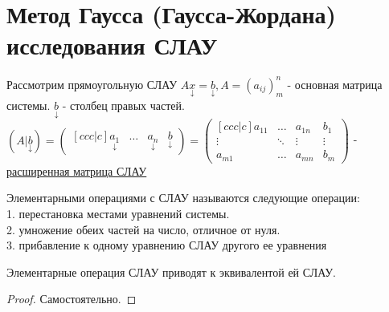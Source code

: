 \documentclass[../main.tex]{subfiles}
\begin{document}
\section{Метод Гаусса (Гаусса-Жордана) исследования СЛАУ}
Рассмотрим  прямоугольную СЛАУ $A \underset{\downarrow}{x}=\underset{\downarrow}{b}, A = (a_{ij})_{m}^{n}$ - основная матрица системы. $\underset{\downarrow}{b}$ - столбец правых частей. $(A|\underset{\downarrow}{b})=\begin{pmatrix}[ccc|c]
    \underset{\downarrow}{a_{1}}& \dots & \underset{\downarrow}{a_{n}}& \underset{\downarrow}{b}
\end{pmatrix}=\begin{pmatrix}[ccc|c]
    a_{11}&\dots & a_{1n} & b_{1}\\ 
    \vdots & \ddots & \vdots & \vdots \\ 
    a_{m1} & \dots & a_{mn} & b_{m}
\end{pmatrix}$ - \underline{расширенная матрица СЛАУ}
\begin{definition}
    Элементарными операциями с СЛАУ называются следующие операции:
    \\ 1. перестановка местами уравнений системы. 
    \\2. умножение обеих частей на число, отличное от нуля. 
    \\3. прибавление к одному уравнению СЛАУ другого ее уравнения
\end{definition}


\begin{theorem}
    Элементарные операция СЛАУ приводят к эквивалентой ей СЛАУ.
\end{theorem}
\begin{proof}
    Самостоятельно.
\end{proof}
\end{document}
